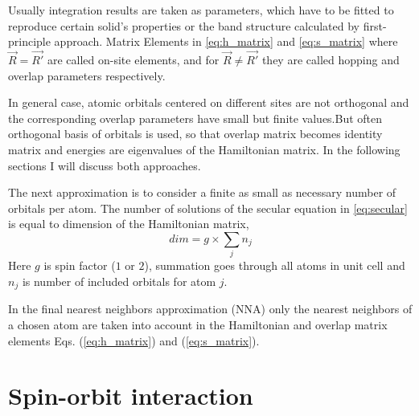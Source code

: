 Usually integration results are taken as parameters, which have to be fitted to reproduce certain solid's properties or the band structure calculated by first-principle approach. Matrix Elements in \ref{eq:h_matrix} and \ref{eq:s_matrix} where $\vec{R} = \vec{R'}$ are called on-site elements, and for $\vec{R} \neq \vec{R'}$ they are called hopping and overlap parameters respectively. 

In general case, atomic orbitals centered on different sites are not orthogonal and the corresponding overlap parameters have small but finite values.But often orthogonal basis of orbitals is used, so that overlap matrix becomes identity matrix and energies are eigenvalues of the Hamiltonian matrix. In the following sections I will discuss both approaches. 

The next approximation is to consider a finite as small as necessary number of orbitals per atom. The number of solutions of the secular equation in \ref{eq:secular} is equal to dimension of the Hamiltonian matrix,
\begin{equation}
dim = g \times \sum_j n_j
\end{equation}
Here $g$ is spin factor ($1$ or $2$), summation goes through all atoms in unit cell and $n_j$ is number of included orbitals for atom $j$.

In the final nearest neighbors approximation (NNA) only the nearest neighbors of a chosen atom are taken into account in the Hamiltonian and overlap matrix elements Eqs. (\ref{eq:h_matrix}) and (\ref{eq:s_matrix}).
\section{Spin-orbit interaction }
